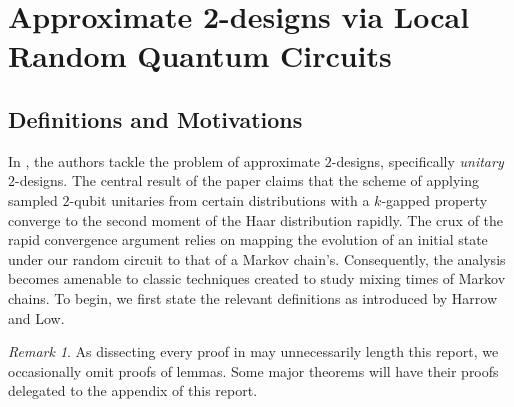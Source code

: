 \documentclass[12pt]{amsart}
\theoremstyle{definition}
\theoremstyle{remark}
\newtheorem{remark}[theorem]{Remark}
\numberwithin{equation}{section}
\theoremstyle{remark}
\begin{document}
\section{Approximate 2-designs via Local Random Quantum Circuits}

\subsection{Definitions and Motivations}
In \cite{harrlow}, the authors tackle the problem of approximate $2$-designs, specifically \emph{unitary} $2$-designs. The central result of the paper claims that the scheme of applying sampled $2$-qubit unitaries from certain distributions with a $k$-gapped property converge to the second moment of the Haar distribution rapidly. The crux of the rapid convergence argument relies on mapping the evolution of an initial state under our random circuit to that of a Markov chain's.
Consequently, the analysis becomes amenable to classic techniques created to study mixing times of Markov chains. To begin, we first state the relevant definitions as introduced by Harrow and Low.
%
\begin{remark}
  As dissecting every proof in \cite{harrlow} may unnecessarily length this report, we occasionally omit proofs of lemmas. Some major theorems will have their proofs delegated to the appendix of this report.
\end{remark}
\end{document}
